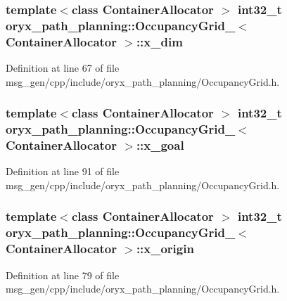\subsubsection[{x\-\_\-dim}]{\setlength{\rightskip}{0pt plus 5cm}template$<$class Container\-Allocator $>$ int32\-\_\-t {\bf oryx\-\_\-path\-\_\-planning\-::\-Occupancy\-Grid\-\_\-}$<$ \-Container\-Allocator $>$\-::{\bf x\-\_\-dim}}\label{structoryx__path__planning_1_1OccupancyGrid___aed775fc8e1fb303a18933290aec0fcf8}


\-Definition at line 67 of file msg\-\_\-gen/cpp/include/oryx\-\_\-path\-\_\-planning/\-Occupancy\-Grid.\-h.

\subsubsection[{x\-\_\-goal}]{\setlength{\rightskip}{0pt plus 5cm}template$<$class Container\-Allocator $>$ int32\-\_\-t {\bf oryx\-\_\-path\-\_\-planning\-::\-Occupancy\-Grid\-\_\-}$<$ \-Container\-Allocator $>$\-::{\bf x\-\_\-goal}}\label{structoryx__path__planning_1_1OccupancyGrid___af04e0b4df0297f69649a13bfbf335b6b}


\-Definition at line 91 of file msg\-\_\-gen/cpp/include/oryx\-\_\-path\-\_\-planning/\-Occupancy\-Grid.\-h.

\subsubsection[{x\-\_\-origin}]{\setlength{\rightskip}{0pt plus 5cm}template$<$class Container\-Allocator $>$ int32\-\_\-t {\bf oryx\-\_\-path\-\_\-planning\-::\-Occupancy\-Grid\-\_\-}$<$ \-Container\-Allocator $>$\-::{\bf x\-\_\-origin}}\label{structoryx__path__planning_1_1OccupancyGrid___a9ea392902f89bf2ece9a0a91f81389d6}


\-Definition at line 79 of file msg\-\_\-gen/cpp/include/oryx\-\_\-path\-\_\-planning/\-Occupancy\-Grid.\-h.

